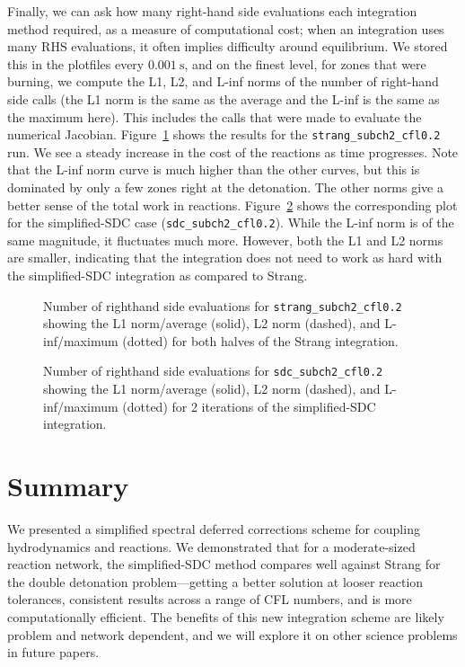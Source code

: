 \documentclass[linenumbers]{aastex631}
\newcommand{\MarginPar}[1]{\marginpar{\vskip-\baselineskip\raggedright\tiny\sffamily\hrule\smallskip{\color{red}#1}\par\smallskip\hrule}}
\begin{document}
Finally, we can ask how many right-hand side evaluations each integration method required, as a measure of computational cost; when an integration uses many RHS evaluations, it often implies difficulty around equilibrium.  We stored this in the plotfiles every $0.001~\mathrm{s}$, and on the finest level, for zones that were burning, we compute the L1, L2, and L-inf norms of the number of right-hand side calls (the L1 norm is the same as the average and the L-inf is the same as the maximum here).  This includes the calls that were made to evaluate the numerical Jacobian.  Figure~\ref{fig:strang_nrhs} shows the results for the {\tt strang\_subch2\_cfl0.2} run.  We see a steady
increase in the cost of the reactions as time progresses.  Note that the L-inf norm curve is much higher than the other curves, but this is dominated by only a few zones right at the detonation.  The other norms give a better sense of the total work in reactions.
Figure~\ref{fig:sdc_nrhs} shows the corresponding plot for the simplified-SDC case ({\tt sdc\_subch2\_cfl0.2}).  While the L-inf
norm is of the same magnitude, it fluctuates much more.  However,
both the L1 and L2 norms are smaller, indicating that the integration does not need to work as hard with the simplified-SDC integration as compared to Strang.

\begin{figure}[t]
\caption{\label{fig:strang_nrhs} Number of righthand side evaluations for {\tt strang\_subch2\_cfl0.2} showing the L1 norm/average (solid), L2 norm (dashed), and L-inf/maximum (dotted)
for both halves of the Strang integration.}
\end{figure}

\begin{figure}[t]
\caption{\label{fig:sdc_nrhs} Number of righthand side evaluations for {\tt sdc\_subch2\_cfl0.2} showing the L1 norm/average (solid), L2 norm (dashed), and L-inf/maximum (dotted)
for 2 iterations of the simplified-SDC integration.}
\end{figure}
\section{Summary}

We presented a simplified spectral deferred corrections scheme for coupling
hydrodynamics and reactions.  We demonstrated that for a moderate-sized reaction
network, the simplified-SDC method compares well against Strang for the double
detonation problem---getting a better solution at looser reaction tolerances,
consistent results across a range of CFL numbers, and is more computationally efficient.
The benefits of this new
integration scheme are likely problem and network dependent, and we will explore
it on other science problems in future papers.
\end{document}
